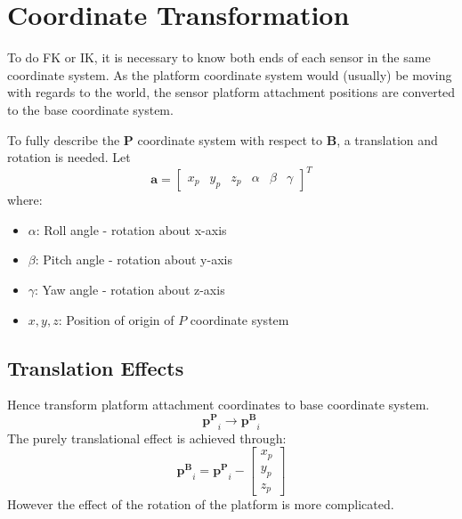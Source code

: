 \documentclass[]{article}
\newcommand\vect[1]{\bm{#1}} %
\begin{document}
\section{Coordinate Transformation}
\par
	To do FK or IK, it is necessary to know both ends of each sensor in the same coordinate system. As the platform coordinate system would (usually) be moving with regards to the world, the sensor platform attachment positions are converted to the base coordinate system.
\par
	To fully describe the $\vect{P}$ coordinate system with respect to $\vect{B}$, a translation and rotation is needed. Let
	$$\vect{a} = \begin{bmatrix}
	x_p & y_p & z_p & \alpha & \beta & \gamma
	\end{bmatrix}^T $$
	where:
	\begin{itemize}
		\item $\alpha$: Roll angle - rotation about x-axis
		\item $\beta$: Pitch angle - rotation about y-axis
		\item $\gamma$: Yaw angle - rotation about z-axis
		\item $x,y,z$: Position of origin of $P$ coordinate system
	\end{itemize}

\subsection{Translation Effects}
\par
	Hence transform platform attachment coordinates to base coordinate system.
	$$\vect{p^P}_i \longrightarrow \vect{p^B}_i$$
	The purely translational effect is achieved through:
	$$\vect{p^B}_i = \vect{p^P}_i - \begin{bmatrix}
		x_p \\ 
		y_p \\ 
		z_p
	\end{bmatrix} $$
	However the effect of the rotation of the platform is more complicated.
\end{document}
